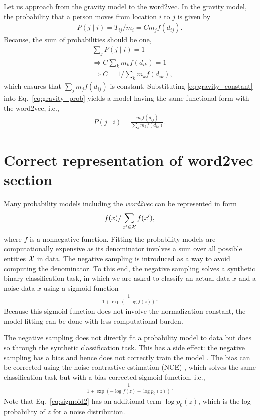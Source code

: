 \documentclass[12pt]{article} %
\def\given{\mid}
\def\ie{i.e.,~}
\begin{document}
Let us approach from the gravity model to the word2vec.
In the gravity model, the probability that a person moves from location $i$ to $j$ is given by
\begin{align}
    P\left(j \given i \right) = T_{ij} / m_i = C m_j f(d_{ij}). \label{eq:gravity_prob}
\end{align}
Because, the sum of probabilities should be one,
\begin{align}
     & \sum_{j} P(j \given i) = 1 \nonumber                                     \\
     & \Rightarrow C \sum_{k} m_k f(d_{ik}) = 1 \nonumber                       \\
     & \Rightarrow C  = 1 / \sum_{k} m_k f(d_{ik}), \label{eq:gravity_constant}
\end{align}
which ensures that $\sum_{j} m_j f(d_{ij})$ is constant.
Substituting \eqref{eq:gravity_constant}  into Eq.~\eqref{eq:gravity_prob} yields a model having the same functional form with the word2vec, \ie
\begin{align}
    P\left(j \given i \right) = \frac{m_i f(d_{ij})}{\sum_{k} m_k f(d_{ik})}. \label{eq:gravity_prob2}
\end{align}


\section{Correct representation of word2vec section}
\label{sec:correct_word2vec}

Many probability models including the \textit{word2vec} can be represented in form
\begin{align}
    f(x) / \sum_{x' \in {\cal X}} f(x'),
\end{align}
where $f$ is a nonnegative function.
Fitting the probability models are computationally expensive as its denominator involves a sum over all possible entities ${\cal X}$ in data.
The negative sampling is introduced as a way to avoid computing the denominator.
To this end, the negative sampling solves a synthetic binary classification task, in which
we are asked to classify an actual data $x$ and a noise data $\tilde x$ using a sigmoid function
\begin{align}
    \label{eq:sigmoid}
    \frac{1}{1 + \exp\left( -\log f(z) \right)}.
\end{align}
Because this sigmoid function does not involve the normalization constant, the model fitting can be done with less computational burden.


The negative sampling does not directly fit a probability model to data but does so through the synthetic classification task.
This has a side effect: the negative sampling has a bias and hence does not correctly train the model \cite{Dyer2014}.
The bias can be corrected using the noise contrastive estimation (NCE) \cite{Chia2010}, which solves the
same classification task but with a bias-corrected sigmoid function, \ie
\begin{align}
    \label{eq:sigmoid2}
    \frac{1}{1 + \exp\left( -\log f(z) + \log p_0(z) \right)}.
\end{align}
Note that Eq.~\eqref{eq:sigmoid2} has an additional term $\log p_0(z)$, which is the log-probability of $z$ for a noise distribution.
\end{document}
